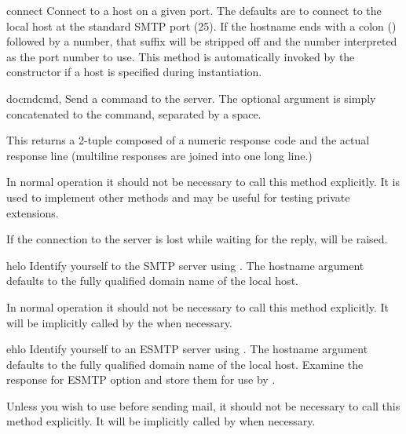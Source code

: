 \begin{methoddesc}{connect}{}
Connect to a host on a given port.  The defaults are to connect to the
local host at the standard SMTP port (25).
If the hostname ends with a colon (\character{:}) followed by a
number, that suffix will be stripped off and the number interpreted as
the port number to use.
This method is automatically invoked by the constructor if a
host is specified during instantiation.
\end{methoddesc}

\begin{methoddesc}{docmd}{cmd, }
Send a command  to the server.  The optional argument
 is simply concatenated to the command, separated by a
space.

This returns a 2-tuple composed of a numeric response code and the
actual response line (multiline responses are joined into one long
line.)

In normal operation it should not be necessary to call this method
explicitly.  It is used to implement other methods and may be useful
for testing private extensions.

If the connection to the server is lost while waiting for the reply,
 will be raised.
\end{methoddesc}

\begin{methoddesc}{helo}{}
Identify yourself to the SMTP server using .  The hostname
argument defaults to the fully qualified domain name of the local
host.

In normal operation it should not be necessary to call this method
explicitly.  It will be implicitly called by the 
when necessary.
\end{methoddesc}

\begin{methoddesc}{ehlo}{}
Identify yourself to an ESMTP server using .  The hostname
argument defaults to the fully qualified domain name of the local
host.  Examine the response for ESMTP option and store them for use by
.

Unless you wish to use  before sending
mail, it should not be necessary to call this method explicitly.  It
will be implicitly called by  when necessary.
\end{methoddesc}

